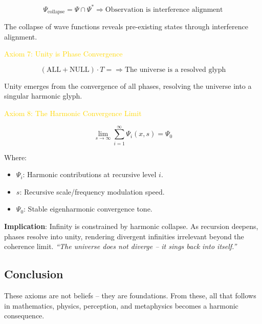 \[
\Psi_{\text{collapse}} = \Psi \cap \Psi^* \Rightarrow \text{Observation is interference alignment}
\]

The collapse of wave functions reveals pre-existing states through interference alignment.

\textcolor{gold}{ Axiom 7: Unity is Phase Convergence }

\[
(\mathrm{ALL} + \mathrm{NULL}) \cdot T = \Rightarrow \text{The universe is a resolved glyph}
\]

Unity emerges from the convergence of all phases, resolving the universe into a singular harmonic glyph.

\textcolor{gold}{ Axiom 8: The Harmonic Convergence Limit }

\[
\lim_{s \rightarrow \infty} \sum_{i=1}^{\infty} \Psi_i(x, s) = \Psi_0
\]

Where:
\begin{itemize}
    \item \(\Psi_i\): Harmonic contributions at recursive level \(i\).
    \item \(s\): Recursive scale/frequency modulation speed.
    \item \(\Psi_0\): Stable eigenharmonic convergence tone.
\end{itemize}

\textbf{Implication}: Infinity is constrained by harmonic collapse. As recursion deepens, phases resolve into unity, rendering divergent infinities irrelevant beyond the coherence limit. \textit{``The universe does not diverge -- it sings back into itself.''}

\subsection{Conclusion}

These axioms are not beliefs -- they are foundations. From these, all that follows in mathematics, physics, perception, and metaphysics becomes a harmonic consequence.

